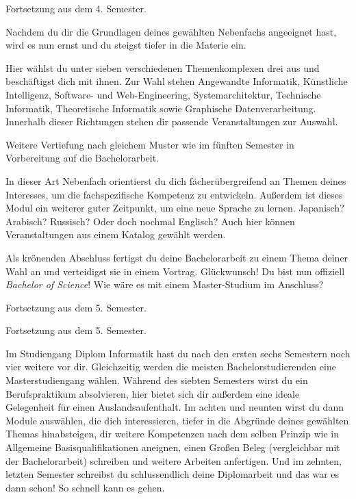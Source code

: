 Fortsetzung aus dem 4. Semester.

Nachdem du dir die Grundlagen deines gewählten Nebenfachs angeeignet hast, wird es nun ernst und du steigst tiefer in die Materie ein.

Hier wählst du unter sieben verschiedenen Themenkomplexen drei aus und beschäftigst dich mit ihnen.
Zur Wahl stehen Angewandte Informatik, Künstliche Intelligenz, Software- und Web-Engineering, Systemarchitektur, Technische Informatik, Theoretische Informatik sowie Graphische Datenverarbeitung.
Innerhalb dieser Richtungen stehen dir passende Veranstaltungen zur Auswahl.


Weitere Vertiefung nach gleichem Muster wie im fünften Semester in Vorbereitung auf die Bachelorarbeit.

In dieser Art Nebenfach orientierst du dich fächerübergreifend an Themen deines Interesses, um die fachspezifische Kompetenz zu entwickeln.
Außerdem ist dieses Modul ein weiterer guter Zeitpunkt, um eine neue Sprache zu lernen. Japanisch? Arabisch? Russisch? Oder doch nochmal Englisch?
Auch hier können Veranstaltungen aus einem Katalog gewählt werden.

\newpage

Als krönenden Abschluss fertigst du deine Bachelorarbeit zu einem Thema deiner Wahl an und verteidigst sie in einem Vortrag.
Glückwunsch! Du bist nun offiziell \textit{Bachelor of Science}! Wie wäre es mit einem Master-Studium im Anschluss?

Fortsetzung aus dem 5. Semester.

Fortsetzung aus dem 5. Semester.


Im Studiengang Diplom Informatik hast du nach den ersten sechs Semestern noch vier weitere vor dir. Gleichzeitig werden die meisten Bachelorstudierenden eine Masterstudiengang wählen.
Während des siebten Semesters wirst du ein Berufspraktikum absolvieren, hier bietet sich dir außerdem eine ideale Gelegenheit für einen Auslandsaufenthalt.
Im achten und neunten wirst du dann Module auswählen, die dich interessieren, tiefer in die Abgründe deines gewählten Themas hinabsteigen, dir weitere Kompetenzen nach dem selben Prinzip wie in \glqq{}Allgemeine Basisqualifikationen\grqq{} aneignen, einen \glqq{}Großen Beleg\grqq{} (vergleichbar mit der Bachelorarbeit) schreiben und weitere Arbeiten anfertigen.
Und im zehnten, letzten Semester schreibst du schlussendlich deine Diplomarbeit und das war es dann schon!
So schnell kann es gehen.

